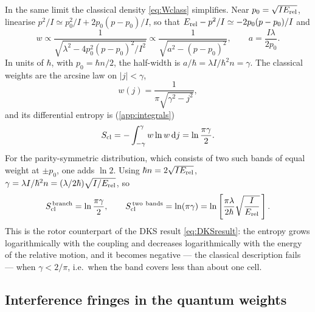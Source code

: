 \documentclass[preprint,12pt]{elsarticle}
\newcommand{\dd}{\mathrm{d}}
\newcommand{\Erel}{E_{\rm rel}}
\newcommand{\Scl}{S_{\rm cl}}
\begin{document}
In the same limit the classical density \eqref{eq:Wclass} simplifies. Near
$p_{0}=\sqrt{I\Erel}$, linearise $p^{2}/I\simeq p_{0}^{2}/I+2p_{0}(p-p_{0})/I$, so
that $\Erel-p^{2}/I\simeq-2p_{0}(p-p_{0})/I$ and
\begin{equation}
w\propto\frac{1}{\sqrt{\lambda^{2}-4p_{0}^{2}(p-p_{0})^{2}/I^{2}}}
\propto\frac{1}{\sqrt{a^{2}-(p-p_{0})^{2}}},\qquad a=\frac{I\lambda}{2p_{0}}.
\end{equation}
In units of $\hbar$, with $p_{0}=\hbar n/2$, the half-width is
$a/\hbar=\lambda I/\hbar^{2}n=\gamma$. The classical weights are the arcsine law
on $|j|<\gamma$,
\begin{equation}
w(j)=\frac{1}{\pi\sqrt{\gamma^{2}-j^{2}}},
\label{eq:arcsine}
\end{equation}
and its differential entropy is (\ref{app:integrals})
\begin{equation}
\Scl=-\int_{-\gamma}^{\gamma}w\ln w\,\dd j=\ln\frac{\pi\gamma}{2}.
\label{eq:Sarcsine}
\end{equation}
For the parity-symmetric distribution, which consists of two such bands of
equal weight at $\pm p_{0}$, one adds $\ln2$. Using $\hbar n=2\sqrt{I\Erel}$,
$\gamma=\lambda I/\hbar^{2}n=(\lambda/2\hbar)\sqrt{I/\Erel}$, so
\begin{equation}
\Scl^{\,\rm branch}=\ln\frac{\pi\gamma}{2},\qquad
\Scl^{\,\rm two\ bands}=\ln(\pi\gamma)
=\ln\left[\frac{\pi\lambda}{2\hbar}\sqrt{\frac{I}{\Erel}}\,\right].
\label{eq:Sclrot}
\end{equation}
This is the rotor counterpart of the DKS result \eqref{eq:DKSresult}: the
entropy grows logarithmically with the coupling and decreases logarithmically
with the energy of the relative motion, and it becomes negative --- the
classical description fails --- when $\gamma<2/\pi$, i.e.\ when the band covers
less than about one cell.

\subsection{Interference fringes in the quantum weights}
\end{document}
